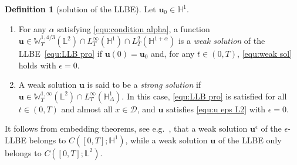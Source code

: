 \documentclass[11pt,reqno]{amsart}
\theoremstyle{definition}
\newtheorem{definition}[theorem]{Definition}
\numberwithin{equation}{section}
\newcommand{\bff}{\boldsymbol}
\newcommand{\bb}{\mathbb}
\begin{document}
\begin{definition}[solution of the LLBE]\label{def:wea sol LLB}
	Let $\bff{u}_0\in \bb{H}^1$.
	\begin{enumerate}
		\item For any $\alpha$ satisfying \eqref{equ:condition alpha}, a function $\bff{u}\in \bb{W}^{1,4/3}_T(\bb{L}^2) \cap L^\infty_T(\bb{H}^1) \cap L^2_T(\bb{H}^{1+\alpha})$ is a \emph{weak solution} of the LLBE~\eqref{equ:LLB pro} if $\bff{u}(0)=\bff{u}_0$ and, for any $t\in (0,T)$, \eqref{equ:weak sol} holds with $\epsilon=0$. 
		\item A weak solution $\bff{u}$ is said to be a \emph{strong solution} if $\bff{u}\in \bb{W}^{1,\infty}_T(\bb{L}^2) \cap L^\infty_T(\bb{H}^1_\Delta)$. In this case, \eqref{equ:LLB pro} is satisfied
		for all~$t\in(0,T)$ and almost all $x\in \mathscr{D}$, and $\bff{u}$ satisfies \eqref{equ:u eps L2} with $\epsilon=0$.
	\end{enumerate}
\end{definition}


It follows from embedding theorems, see e.g.~\citep[Lemma 1.2]{Lio69}, that a
weak solution $\bff{u}^\epsilon$ of the $\epsilon$-LLBE belongs to $C([0,T];\bb{H}^1)$, while a weak solution $\bff{u}$ of the LLBE {only belongs} to $C([0,T]; \bb{L}^2)$.
\end{document}
